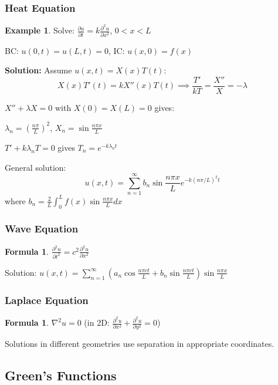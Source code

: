 \documentclass[12pt,a4paper]{article}
\theoremstyle{definition}
\newtheorem{example}[theorem]{Example}
\newtheorem{formula}[theorem]{Formula}
\begin{document}
\subsubsection{Heat Equation}

\begin{example}
Solve: $\frac{\partial u}{\partial t} = k\frac{\partial^2 u}{\partial x^2}$, $0 < x < L$

BC: $u(0,t) = u(L,t) = 0$, IC: $u(x,0) = f(x)$

\textbf{Solution:}
Assume $u(x,t) = X(x)T(t)$:
\[
X(x)T'(t) = kX''(x)T(t) \implies \frac{T'}{kT} = \frac{X''}{X} = -\lambda
\]

$X'' + \lambda X = 0$ with $X(0) = X(L) = 0$ gives:

$\lambda_n = \left(\frac{n\pi}{L}\right)^2$, $X_n = \sin\frac{n\pi x}{L}$

$T' + k\lambda_n T = 0$ gives $T_n = e^{-k\lambda_n t}$

General solution:
\[
u(x,t) = \sum_{n=1}^{\infty} b_n \sin\frac{n\pi x}{L}e^{-k(n\pi/L)^2 t}
\]
where $b_n = \frac{2}{L}\int_0^L f(x)\sin\frac{n\pi x}{L}dx$
\end{example}

\subsubsection{Wave Equation}

\begin{formula}
$\frac{\partial^2 u}{\partial t^2} = c^2\frac{\partial^2 u}{\partial x^2}$

Solution: $u(x,t) = \sum_{n=1}^{\infty}\left(a_n\cos\frac{n\pi ct}{L} + b_n\sin\frac{n\pi ct}{L}\right)\sin\frac{n\pi x}{L}$
\end{formula}

\subsubsection{Laplace Equation}

\begin{formula}
$\nabla^2 u = 0$ (in 2D: $\frac{\partial^2 u}{\partial x^2} + \frac{\partial^2 u}{\partial y^2} = 0$)

Solutions in different geometries use separation in appropriate coordinates.
\end{formula}

\subsection{Green's Functions}
\end{document}
